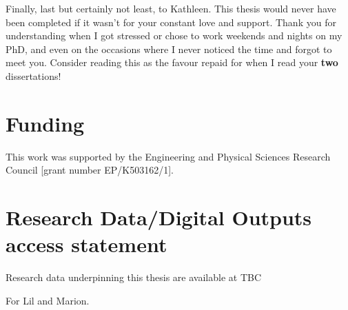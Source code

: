 \documentclass[10pt,a4paper,twoside]{book}
\begin{document}
Finally, last but certainly not least, to Kathleen.
This thesis would never have been completed if it wasn't for your constant love and support.
Thank you for understanding when I got stressed or chose to work weekends and nights on my PhD, and even on the occasions where I never noticed the time and forgot to meet you.
\noindent Consider reading this as the favour repaid for when I read your \textbf{two} dissertations!

\newpage
\section*{Funding}

This work was supported by the Engineering and Physical Sciences Research Council [grant number EP/K503162/1].

\section*{Research Data/Digital Outputs access statement}


Research data underpinning this thesis are available at TBC
\null\newpage
\null\newpage
\null\newpage
\begin{center}
    \vspace*{\fill}
    For Lil and Marion.
    \vspace*{\fill}
\end{center}
\clearpage
\null\newpage

\tableofcontents
\printnoidxglossaries
\newpage

\renewcommand{\cftdotsep}{\cftnodots}%

\listoffigures
{}

\mainmatter











\end{document}
